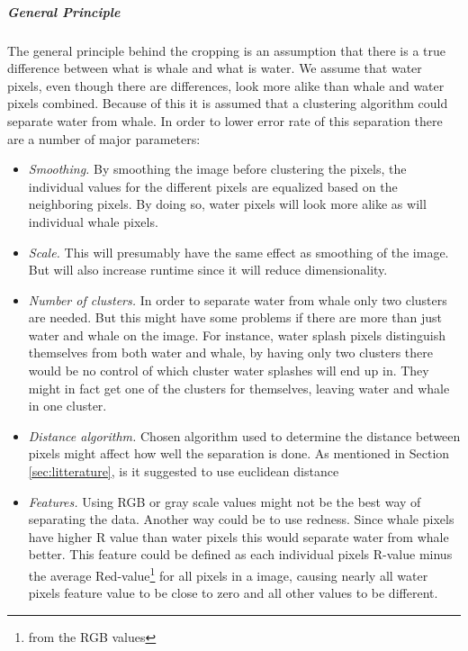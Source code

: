 \subparagraph{General Principle}
The general principle behind the cropping is an assumption that there is a true difference between what is whale and what is water. We assume that water pixels, even though there are differences, look more alike than whale and water pixels combined.
Because of this it is assumed that a clustering algorithm could separate water from whale.
In order to lower error rate of this separation there are a number of major parameters:
\begin{itemize}
\item \textit{Smoothing.} By smoothing the image before clustering the pixels, the individual values for the different pixels are equalized based on the neighboring pixels. By doing so, water pixels will look more alike as will individual whale pixels.
\item \textit{Scale.} This will presumably have the same effect as smoothing of the image. But will also increase runtime since it will reduce dimensionality.  
\item \textit{Number of clusters.} In order to separate water from whale only two clusters are needed. But this might have some problems if there are more than just water and whale on the image. For instance, water splash pixels distinguish themselves from both water and whale, by having only two clusters there would be no control of which cluster water splashes will end up in. They might in fact get one of the clusters for themselves, leaving water and whale in one cluster.
\item \textit{Distance algorithm.} Chosen algorithm used to determine the distance between pixels might affect how well the separation is done. As mentioned in Section \ref{sec:litterature}, is it suggested to use euclidean distance
\item \textit{Features.} Using RGB or gray scale values might not be the best way of separating the data. 
Another way could be to use redness. Since whale pixels have higher R value than water pixels this would separate water from whale better.
This feature could be defined as each individual pixels R-value minus the average Red-value\footnote{from the RGB values} for all pixels in a image, causing nearly all water pixels feature value to be close to zero and all other values to be different. 
\end{itemize}
